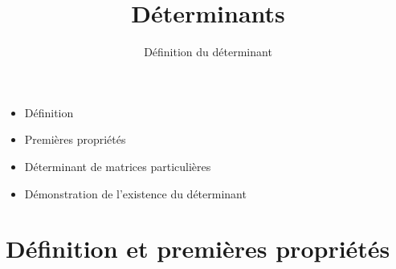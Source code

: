 


   





\title{{\bf Déterminants}}
\subtitle{Définition du déterminant}

\begin{frame}
  
  \debutmontitre

  \pause

{\footnotesize
\hfill
{}
\begin{minipage}{0.6\textwidth}
  \begin{itemize}
    \item<3-> Définition
    \item<4-> Premières propriétés
    \item<5-> Déterminant de matrices particulières
    \item<6-> Démonstration de l'existence du déterminant
  \end{itemize}
\end{minipage}
}

\end{frame}

\setcounter{framenumber}{0}


\section{Définition et premières propriétés}

